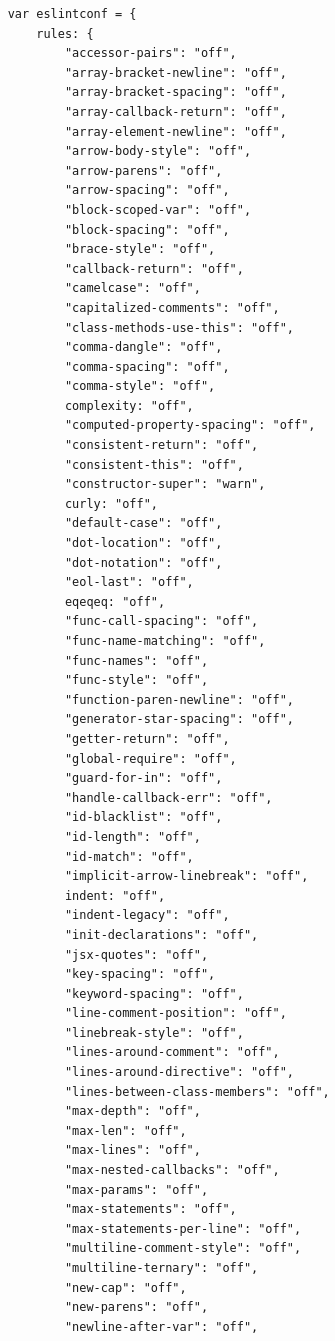\begin{small}
\begin{verbatim}
    var eslintconf = {
        rules: {
            "accessor-pairs": "off",
            "array-bracket-newline": "off",
            "array-bracket-spacing": "off",
            "array-callback-return": "off",
            "array-element-newline": "off",
            "arrow-body-style": "off",
            "arrow-parens": "off",
            "arrow-spacing": "off",
            "block-scoped-var": "off",
            "block-spacing": "off",
            "brace-style": "off",
            "callback-return": "off",
            "camelcase": "off",
            "capitalized-comments": "off",
            "class-methods-use-this": "off",
            "comma-dangle": "off",
            "comma-spacing": "off",
            "comma-style": "off",
            complexity: "off",
            "computed-property-spacing": "off",
            "consistent-return": "off",
            "consistent-this": "off",
            "constructor-super": "warn",
            curly: "off",
            "default-case": "off",
            "dot-location": "off",
            "dot-notation": "off",
            "eol-last": "off",
            eqeqeq: "off",
            "func-call-spacing": "off",
            "func-name-matching": "off",
            "func-names": "off",
            "func-style": "off",
            "function-paren-newline": "off",
            "generator-star-spacing": "off",
            "getter-return": "off",
            "global-require": "off",
            "guard-for-in": "off",
            "handle-callback-err": "off",
            "id-blacklist": "off",
            "id-length": "off",
            "id-match": "off",
            "implicit-arrow-linebreak": "off",
            indent: "off",
            "indent-legacy": "off",
            "init-declarations": "off",
            "jsx-quotes": "off",
            "key-spacing": "off",
            "keyword-spacing": "off",
            "line-comment-position": "off",
            "linebreak-style": "off",
            "lines-around-comment": "off",
            "lines-around-directive": "off",
            "lines-between-class-members": "off",
            "max-depth": "off",
            "max-len": "off",
            "max-lines": "off",
            "max-nested-callbacks": "off",
            "max-params": "off",
            "max-statements": "off",
            "max-statements-per-line": "off",
            "multiline-comment-style": "off",
            "multiline-ternary": "off",
            "new-cap": "off",
            "new-parens": "off",
            "newline-after-var": "off",

\end{verbatim}
\end{small}
